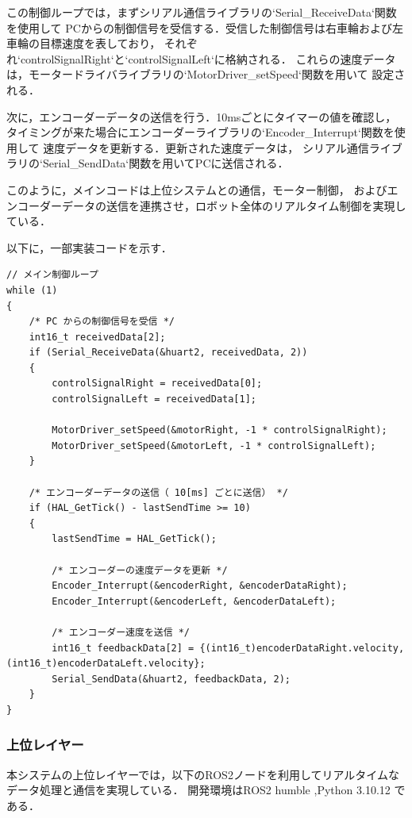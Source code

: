 この制御ループでは，まずシリアル通信ライブラリの`Serial\_ReceiveData`関数を使用して
PCからの制御信号を受信する．受信した制御信号は右車輪および左車輪の目標速度を表しており，
それぞれ`controlSignalRight`と`controlSignalLeft`に格納される．
これらの速度データは，モータードライバライブラリの`MotorDriver\_setSpeed`関数を用いて
設定される．

次に，エンコーダーデータの送信を行う．10msごとにタイマーの値を確認し，
タイミングが来た場合にエンコーダーライブラリの`Encoder\_Interrupt`関数を使用して
速度データを更新する．更新された速度データは，
シリアル通信ライブラリの`Serial\_SendData`関数を用いてPCに送信される．

このように，メインコードは上位システムとの通信，モーター制御，
およびエンコーダーデータの送信を連携させ，ロボット全体のリアルタイム制御を実現している．


以下に，一部実装コードを示す．

\lstset{language=C, caption=メイン制御ループ (main.c)}
\begin{lstlisting}
// メイン制御ループ
while (1)
{
    /* PC からの制御信号を受信 */
    int16_t receivedData[2];
    if (Serial_ReceiveData(&huart2, receivedData, 2))
    {
        controlSignalRight = receivedData[0];
        controlSignalLeft = receivedData[1];

        MotorDriver_setSpeed(&motorRight, -1 * controlSignalRight);
        MotorDriver_setSpeed(&motorLeft, -1 * controlSignalLeft);
    }

    /* エンコーダーデータの送信（ 10[ms] ごとに送信） */
    if (HAL_GetTick() - lastSendTime >= 10)
    {
        lastSendTime = HAL_GetTick();

        /* エンコーダーの速度データを更新 */
        Encoder_Interrupt(&encoderRight, &encoderDataRight);
        Encoder_Interrupt(&encoderLeft, &encoderDataLeft);

        /* エンコーダー速度を送信 */
        int16_t feedbackData[2] = {(int16_t)encoderDataRight.velocity, (int16_t)encoderDataLeft.velocity};
        Serial_SendData(&huart2, feedbackData, 2);
    }
}
\end{lstlisting}


\subsubsection{上位レイヤー}
本システムの上位レイヤーでは，以下のROS2ノードを利用してリアルタイムなデータ処理と通信を実現している．
開発環境はROS2 humble ,Python 3.10.12 である．

